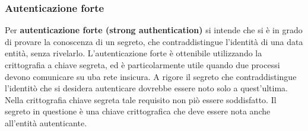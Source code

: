 \subsubsection{Autenticazione forte}
Per \textbf{autenticazione forte (strong authentication)} si intende che si è in grado di provare la conoscenza di un segreto, che contraddistingue l’identità di una data entità, senza rivelarlo. L’autenticazione forte è ottenibile utilizzando la crittografia a chiave segreta, ed è particolarmente utile quando due processi devono comunicare su uba rete insicura. A rigore il segreto che contraddistingue l'identitò che si desidera autenticare dovrebbe essere noto solo a quest'ultima. Nella crittografia chiave segreta tale requisito non piò essere soddisfatto. Il segreto in questione è una chiave crittografica che deve essere nota anche all'entità autenticante.

